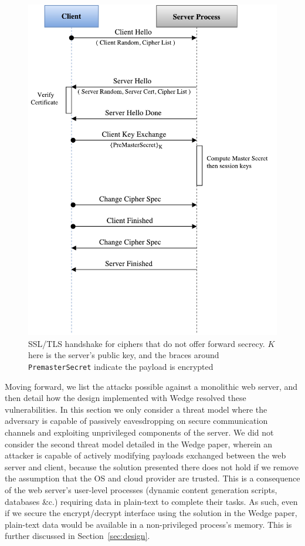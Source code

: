 \documentclass[../main.tex]{subfiles}
\begin{document}
\begin{figure}[H]
  \centering
  \includegraphics[scale=0.4]{images/rsa-handshake-pristine.pdf}
  \caption[SSL/TLS ``RSA'' handshake]{SSL/TLS handshake for ciphers
    that do not offer forward secrecy. $K$ here is the server's public
    key, and the braces around \texttt{PremasterSecret} indicate the
    payload is encrypted}
  \label{fig:pristrsashake}
\end{figure}

Moving forward, we list the attacks possible against a monolithic web
server, and then detail how the design implemented with Wedge resolved
these vulnerabilities. In this section we only consider a threat
model where the adversary is capable of passively eavesdropping on
secure communication channels and exploiting unprivileged components
of the server. We did not consider the second threat model detailed in
the Wedge paper, wherein an attacker is capable of actively modifying
payloads exchanged between the web server and client, because the
solution presented there does not hold if we remove the assumption
that the OS and cloud provider are trusted. This is a consequence of
the web server's user-level processes (dynamic content generation
scripts, databases \&c.)  requiring data in plain-text to complete
their tasks. As such, even if we secure the encrypt/decrypt interface
using the solution in the Wedge paper, plain-text data would
be available in a non-privileged process's memory. This is further
discussed in Section~\ref{sec:design}.
\end{document}

